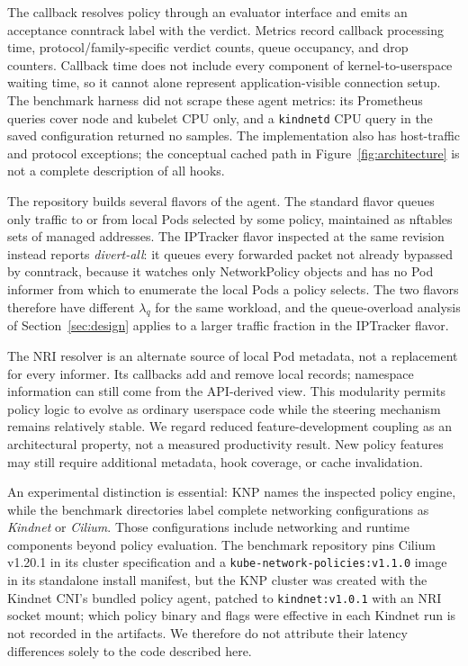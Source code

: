 \documentclass[letterpaper,twocolumn,10pt]{article}
\newcommand{\sys}{\textsc{KNP}}
\begin{document}
The callback resolves policy through an evaluator interface and emits
an acceptance conntrack label with the verdict. Metrics record callback
processing time, protocol/family-specific verdict counts, queue occupancy,
and drop counters. Callback time does not include every component of
kernel-to-userspace waiting time, so it cannot alone represent
application-visible connection setup. The benchmark harness did not
scrape these agent metrics: its Prometheus queries cover node and
kubelet CPU only, and a \texttt{kindnetd} CPU query in the saved
configuration returned no samples. The implementation also has
host-traffic and protocol exceptions; the conceptual cached path in
Figure~\ref{fig:architecture} is not a complete description of all hooks.

The repository builds several flavors of the agent. The standard flavor
queues only traffic to or from local Pods selected by some policy,
maintained as nftables sets of managed addresses. The IPTracker flavor
inspected at the same revision instead reports \emph{divert-all}: it
queues every forwarded packet not already bypassed by conntrack,
because it watches only NetworkPolicy objects and has no Pod informer
from which to enumerate the local Pods a policy selects. The two flavors
therefore have different $\lambda_q$ for the same workload, and the
queue-overload analysis of Section~\ref{sec:design} applies to a larger
traffic fraction in the IPTracker flavor.

The NRI resolver is an alternate source of local Pod metadata, not a
replacement for every informer. Its callbacks add and remove local
records; namespace information can still come from the API-derived
view. This modularity permits policy logic to evolve as ordinary
userspace code while the steering mechanism remains relatively stable.
We regard reduced feature-development coupling as an architectural
property, not a measured productivity result. New policy features may
still require additional metadata, hook coverage, or cache invalidation.

An experimental distinction is essential: \sys{} names the inspected
policy engine, while the benchmark directories label complete networking
configurations as \emph{Kindnet} or \emph{Cilium}. Those configurations
include networking and runtime components beyond policy evaluation.
The benchmark repository pins Cilium v1.20.1 in its cluster specification
and a \texttt{kube-network-policies:v1.1.0} image in its standalone
install manifest, but the \sys{} cluster was created with the Kindnet
CNI's bundled policy agent, patched to \texttt{kindnet:v1.0.1} with an
NRI socket mount; which policy binary and flags were effective in each
Kindnet run is not recorded in the artifacts. We therefore do not
attribute their latency differences solely to the code described here.
\end{document}
